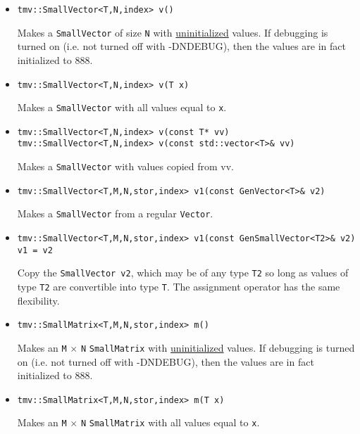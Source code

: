 \documentclass[twoside,letterpaper,11pt]{article}
\renewcommand{\tt}[1]{{\texttt {#1}}}
\begin{document}
\begin{itemize}
\item 
\begin{verbatim}
tmv::SmallVector<T,N,index> v()
\end{verbatim}
Makes a \tt{SmallVector} of size \tt{N}
with \underline{uninitialized} values.
If debugging is turned on (i.e. not turned off
with -DNDEBUG), then the values are in fact initialized to 888. 

\item
\begin{verbatim}
tmv::SmallVector<T,N,index> v(T x)
\end{verbatim}
Makes a \tt{SmallVector} with all values equal to \tt{x}.

\item
\begin{verbatim}
tmv::SmallVector<T,N,index> v(const T* vv)
tmv::SmallVector<T,N,index> v(const std::vector<T>& vv)
\end{verbatim}
Makes a \tt{SmallVector} with values copied from vv.

\item 
\begin{verbatim}
tmv::SmallVector<T,M,N,stor,index> v1(const GenVector<T>& v2)
\end{verbatim}
Makes a \tt{SmallVector} from a regular \tt{Vector}.

\item
\begin{verbatim}
tmv::SmallVector<T,M,N,stor,index> v1(const GenSmallVector<T2>& v2)
v1 = v2
\end{verbatim}
Copy the \tt{SmallVector v2}, which may be of any type \tt{T2} so long
as values of type \tt{T2} are convertible into type \tt{T}.
The assignment operator has the same flexibility.

\item 
\begin{verbatim}
tmv::SmallMatrix<T,M,N,stor,index> m()
\end{verbatim}
Makes an \tt{M} $\times$ \tt{N} \tt{SmallMatrix} 
with \underline{uninitialized} values.
If debugging is turned on (i.e. not turned off
with -DNDEBUG), then the values are in fact initialized to 888. 

\item
\begin{verbatim}
tmv::SmallMatrix<T,M,N,stor,index> m(T x)
\end{verbatim}
Makes an \tt{M} $\times$ \tt{N} \tt{SmallMatrix} with all values equal to \tt{x}.


\end{itemize}
\end{document}
